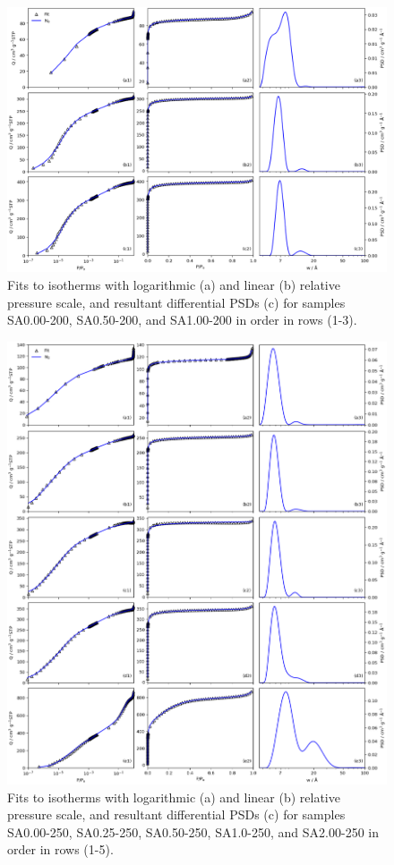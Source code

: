 \begin{appendices}
\begin{figure}[p]
    \centering
    \includegraphics[width=\columnwidth, keepaspectratio]{4-impregnation/figs/SAxxx-200_isopsd.png}
    \caption{Fits to  isotherms with logarithmic (a) and linear (b) relative pressure scale, and resultant differential PSDs (c) for samples SA0.00-200, SA0.50-200, and SA1.00-200 in order in rows (1-3).}
    \label{fig:SAxxx-200_isopsd}
\end{figure}

\begin{figure}[p]
    \centering
    \includegraphics[width=\columnwidth, keepaspectratio]{4-impregnation/figs/SAxxx-250_isopsd.png}
    \caption{Fits to  isotherms with logarithmic (a) and linear (b) relative pressure scale, and resultant differential PSDs (c) for samples SA0.00-250, SA0.25-250, SA0.50-250, SA1.0-250, and SA2.00-250 in order in rows (1-5).}
    \label{fig:SAxxx-250_isopsd}
\end{figure}


\end{appendices}
